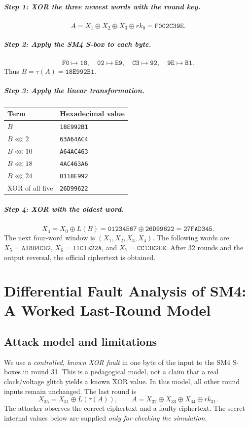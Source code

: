 \documentclass[11pt,a4paper]{report}
\newcommand{\hex}[1]{\texttt{#1}}
\newcommand{\xor}{\mathbin{\oplus}}
\newcommand{\rol}{\mathbin{\lll}}
\begin{document}
\paragraph{Step 1: XOR the three newest words with the round key.}
\[A=X_1\xor X_2\xor X_3\xor rk_0=\hex{F002C39E}.\]
\paragraph{Step 2: Apply the SM4 S-box to each byte.}
\[\hex{F0}\mapsto\hex{18},\quad\hex{02}\mapsto\hex{E9},\quad\hex{C3}\mapsto\hex{92},\quad\hex{9E}\mapsto\hex{B1}.\]
Thus \(B=\tau(A)=\hex{18E992B1}\).
\paragraph{Step 3: Apply the linear transformation.}
\begin{center}\begin{tabular}{ll}\toprule Term&Hexadecimal value\\\midrule\(B\)&\hex{18E992B1}\\\(B\rol2\)&\hex{63A64AC4}\\\(B\rol10\)&\hex{A64AC463}\\\(B\rol18\)&\hex{4AC463A6}\\\(B\rol24\)&\hex{B118E992}\\\midrule XOR of all five&\hex{26D99622}\\\bottomrule\end{tabular}\end{center}
\paragraph{Step 4: XOR with the oldest word.}
\[X_4=X_0\xor L(B)=\hex{01234567}\xor\hex{26D99622}=\boxed{\hex{27FAD345}}.\]
The next four-word window is \((X_1,X_2,X_3,X_4)\). The following words are \(X_5=\hex{A18B4CB2}\), \(X_6=\hex{11C1E22A}\), and \(X_7=\hex{CC13E2EE}\). After 32 rounds and the output reversal, the official ciphertext is obtained.

\chapter{Differential Fault Analysis of SM4: A Worked Last-Round Model}
\section{Attack model and limitations}
We use a \emph{controlled, known XOR fault} in one byte of the input to the SM4 S-boxes in round 31. This is a pedagogical model, not a claim that a real clock/voltage glitch yields a known XOR value. In this model, all other round inputs remain unchanged.
The last round is
\[X_{35}=X_{31}\xor L(\tau(A)),\qquad A=X_{32}\xor X_{33}\xor X_{34}\xor rk_{31}.\]
The attacker observes the correct ciphertext and a faulty ciphertext. The secret internal values below are supplied \emph{only for checking the simulation}.
\end{document}
